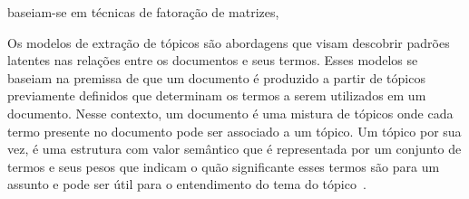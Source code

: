 baseiam-se em técnicas de fatoração de matrizes, 













Os modelos de extração de tópicos são abordagens que visam descobrir padrões latentes nas relações entre os documentos e seus termos. Esses modelos se baseiam na premissa de que um documento é produzido a partir de tópicos previamente definidos que determinam os termos a serem utilizados em um documento. Nesse contexto, um documento é uma mistura de tópicos onde cada termo presente no documento pode ser associado a um tópico. Um tópico por sua vez, é uma estrutura com valor semântico que é representada por um conjunto de termos e seus pesos que indicam o quão significante esses termos são para um assunto e pode ser útil para o  entendimento do tema do tópico~\cite{Steyvers2007,Blei2012}.






































